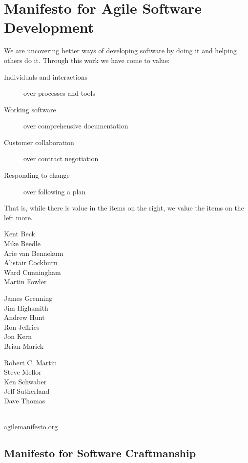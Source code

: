 \begin{minipage}[t]{0.5\linewidth}
\section{Manifesto for Agile Software Development}
We are uncovering better ways of developing
software by doing it and helping others do it.
Through this work we have come to value:
\begin{description}
\item[Individuals and interactions] over processes and tools
\item[Working software] over comprehensive documentation
\item[Customer collaboration] over contract negotiation
\item[Responding to change] over following a plan
\end{description}
That is, while there is value in the items on
the right, we value the items on the left more.\\[2ex]
\begin{minipage}{0.3\linewidth}
Kent Beck\\
Mike Beedle\\
Arie van Bennekum\\
Alistair Cockburn\\
Ward Cunningham\\
Martin Fowler
\end{minipage}
\begin{minipage}{0.3\linewidth}
James Grenning\\
Jim Highsmith\\
Andrew Hunt\\
Ron Jeffries\\
Jon Kern\\
Brian Marick\\
\end{minipage}
\begin{minipage}{0.3\linewidth}
Robert C. Martin\\
Steve Mellor\\
Ken Schwaber\\
Jeff Sutherland\\
Dave Thomas\\
\end{minipage}\\[2ex]
\href{https://agilemanifesto.org}{agilemanifesto.org}

\newslide
\subsection{Manifesto for Software Craftmanship}


\end{minipage}
